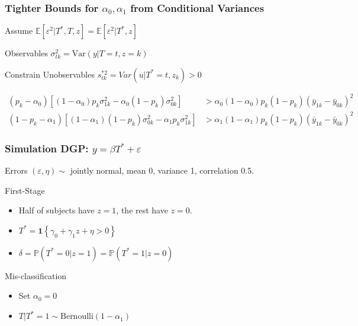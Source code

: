 \documentclass{beamer}
\begin{document}
\begin{frame}
  \frametitle{Tighter Bounds for $\alpha_0, \alpha_1$ from Conditional Variances}
  \begin{block}{Assume}
    $\mathbb{E}[\varepsilon^2|T^*,T,z] = \mathbb{E}[\varepsilon^2|T^*,z]$
  \end{block}

  \begin{block}{Observables}
    $\sigma^2_{tk} = \mbox{Var}(y|T=t,z=k)$ 
  \end{block}

  \begin{block}{Constrain Unobservables}
    $s^{*2}_{tk} = Var(u|T^*=t, z_k) > 0$ 

    \footnotesize
\begin{align*}
  (p_k - \alpha_0) \left[ (1 - \alpha_0)p_k \sigma^2_{1k} - \alpha_0 (1 - p_k)\sigma_{0k}^2 \right] &> \alpha_0 (1 - \alpha_0)p_k (1 - p_k)(\bar{y}_{1k} - \bar{y}_{0k})^2\\
  (1 - p_k - \alpha_1) \left[ (1 - \alpha_1)(1 - p_k) \sigma^2_{0k} - \alpha_1 p_k\sigma_{1k}^2 \right] &> \alpha_1 (1 - \alpha_1)p_k (1 - p_k)(\bar{y}_{1k} - \bar{y}_{0k})^2
\end{align*}
  \end{block}
\end{frame}
\begin{frame}
  \frametitle{Simulation DGP: $y = \beta T^* + \varepsilon$}
  \begin{block}{Errors}
      $(\varepsilon, \eta) \sim $ jointly normal, mean 0, variance 1, correlation 0.5.
  \end{block}
  \begin{block}{First-Stage}
      \begin{itemize}
        \item Half of subjects have $z=1$, the rest have $z=0$.
        \item $T^* = \mathbf{1}\left\{ \gamma_0 + \gamma_1 z + \eta > 0 \right\}$
        \item $\delta = \mathbb{P}(T^* = 0|z =1) = \mathbb{P}(T^*=1|z=0)$
      \end{itemize}
  \end{block}
  \vspace{-1em}


  \begin{block}{Mis-classification}
      \begin{itemize}
        \item Set $\alpha_0 = 0$ 
        \item $T|T^*=1 \sim \mbox{Bernoulli}(1-\alpha_1)$
      \end{itemize}
  \end{block}
  
\end{frame}
\end{document}
